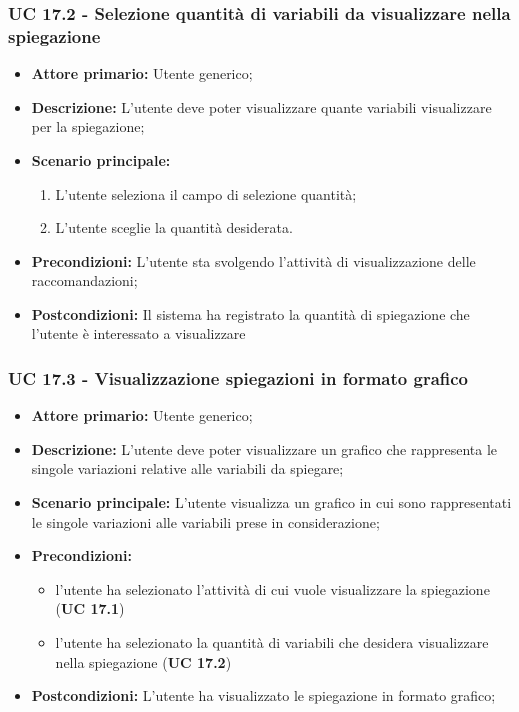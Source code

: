 \subsubsection{UC 17.2 - Selezione quantità di variabili da visualizzare nella spiegazione}
\begin{itemize}
	\item \textbf{Attore primario:} Utente generico;
	\item \textbf{Descrizione:} L'utente deve poter visualizzare quante variabili visualizzare per la spiegazione;
	\item \textbf{Scenario principale:}
	\begin{enumerate}
			\item L'utente seleziona il campo di selezione quantità;
			\item L'utente sceglie la quantità desiderata.
		\end{enumerate}
	
	\item \textbf{Precondizioni:} L'utente sta svolgendo l'attività di visualizzazione delle raccomandazioni;
	\item \textbf{Postcondizioni:} Il sistema ha registrato la quantità di spiegazione che l'utente è interessato a visualizzare
\end{itemize}

\subsubsection{UC 17.3 - Visualizzazione spiegazioni in formato grafico}
\begin{itemize}
	\item \textbf{Attore primario:} Utente generico;
	\item \textbf{Descrizione:} L'utente deve poter visualizzare un grafico che rappresenta le singole variazioni relative alle variabili da spiegare;
	\item \textbf{Scenario principale:} L'utente visualizza un grafico in cui sono rappresentati le singole variazioni alle variabili prese in considerazione;
	
	\item \textbf{Precondizioni:}
	\begin{itemize}
			\item l'utente ha selezionato l'attività di cui vuole visualizzare la spiegazione (\textbf{UC 17.1}) 
	 		\item l'utente ha selezionato la quantità di variabili che desidera visualizzare nella spiegazione 	(\textbf{UC 17.2})
	 	\end{itemize}
	\item \textbf{Postcondizioni:} L'utente ha visualizzato le spiegazione in formato grafico;
\end{itemize}


